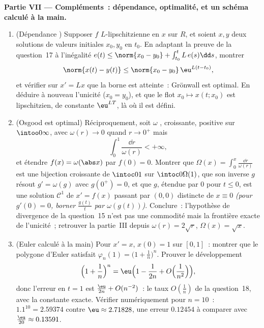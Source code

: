 \begin{problem}[{Problème de fin de semaine --- existence de
solutions de $x' = f(t, x)$ sans Lipschitz}]
\medskip
\noindent\textbf{Partie VII --- Compléments~: dépendance,
optimalité, et un schéma calculé à la main.}
\begin{enumerate}[resume]
  \item (Dépendance ) Supposer $f$ $L$-lipschitzienne
        en $x$ sur $R$, et soient $x, y$ deux solutions de
        valeurs initiales $x_0, y_0$ en $t_0$. En adaptant la
        preuve de la question~17 à l'inégalité $e(t) \leq
        \norm{x_0 - y_0} + \int_{t_0}^tL\,e(s)\dd s$, montrer
        \[
        \norm{x(t) - y(t)} \leq \norm{x_0 - y_0}\,
        \eu^{L(t - t_0)},
        \]
        et vérifier sur $x' = Lx$ que la borne est atteinte~:
        Grönwall est optimal. En déduire à nouveau l'unicité
        ($x_0 = y_0$), et que le flot $x_0 \mapsto x(t; x_0)$
        est lipschitzien, de constante $\eu^{LT}$, là où il est
        défini.
  \item (Osgood est optimal) Réciproquement, soit $\omega$
        , croissante, positive sur $\intoo0\infty$,
        avec $\omega(r) \to 0$ quand $r \to 0^+$ mais
        \[
        \int_0^1\frac{\dd r}{\omega(r)} < +\infty,
        \]
        et étendre $f(x) = \omega(\abs x)$ par $f(0) = 0$.
        Montrer que $\Omega(x) = \int_0^x\frac{\dd
        r}{\omega(r)}$ est une bijection croissante de
        $\intoc0{1}$ sur $\intoc0{\Omega(1)}$, que son inverse
        $g$ résout $g' = \omega(g)$ avec $g(0^+) = 0$, et que
        $g$, étendue par $0$ pour $t \leq 0$, est une solution
        $\mathcal C^1$ de $x' = f(x)$ passant par $(0, 0)$
        distincte de $x \equiv 0$ \emph{(pour $g'(0) = 0$,
        borner $\frac{g(t)}t$ par $\omega(g(t))$)}. Conclure~:
        l'hypothèse de divergence de la question~15 n'est pas
        une commodité mais la frontière exacte de l'unicité~;
        retrouver la partie~III depuis $\omega(r) = 2\sqrt r$,
        $\Omega(x) = \sqrt x$.
  \item (Euler calculé à la main) Pour $x' = x$, $x(0) = 1$ sur
        $[0, 1]$~: montrer que le polygone d'Euler satisfait
        $\varphi_n(1) = \bigl(1 + \frac1n\bigr)^n$. Prouver le
        développement
        \[
        \Bigl(1 + \frac1n\Bigr)^{n}
        = \eu\Bigl(1 - \frac1{2n} + O\Bigl(\frac1{n^2}\Bigr)
        \Bigr),
        \]
        donc l'erreur en $t = 1$ est $\frac{\eu}{2n} +
        O(n^{-2})$~: le taux $O(\frac1n)$ de la question~18,
        avec la constante exacte. Vérifier numériquement pour
        $n = 10$~: $1.1^{10} = 2.59374$ contre $\eu \approx
        2.71828$, une erreur $0.12454$ à comparer avec
        $\frac{\eu}{20} \approx 0.13591$.
\end{enumerate}
\end{problem}
